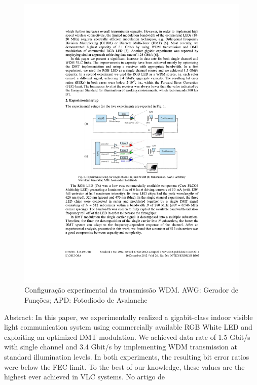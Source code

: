 	\begin{figure}[h]
		\caption{\label{figure:bib-rev}Configuração experimental da transmissão WDM. AWG: Gerador de Funções; APD: Fotodiodo de Avalanche}
		\centering
		\includegraphics[width=\textwidth, trim={5cm 10cm 7cm 12cm},clip]{sant-ana.pdf}
	\end{figure}
	
	
	
	
	Abstract: In this paper, we experimentally realized a gigabit-class indoor
	visible light communication system using commercially available RGB
	White LED and exploiting an optimized DMT modulation. We achieved
	data rate of 1.5 Gbit/s with single channel and 3.4 Gbit/s by implementing
	WDM transmission at standard illumination levels. In both experiments, the
	resulting bit error ratios were below the FEC limit. To the best of our
	knowledge, these values are the highest ever achieved in VLC systems. 
	 No artigo de 
	
